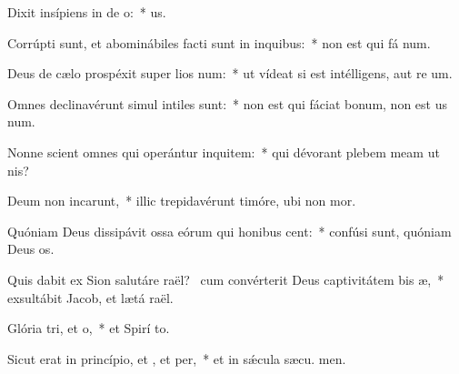 \item Dixit insípiens in de o:~*   us.
\item Corrúpti sunt, et abominábiles facti sunt in inquibus:~* non est qui fá num.
\item Deus de cælo prospéxit super lios num:~* ut vídeat si est intélligens, aut re um.
\item Omnes declinavérunt simul intiles  sunt:~* non est qui fáciat bonum, non est us  num.
\item Nonne scient omnes qui operántur inquitem:~* qui dévorant plebem meam ut  nis?
\item Deum non incarunt,~* illic trepidavérunt timóre, ubi non  mor.
\item Quóniam Deus dissipávit ossa eórum qui honibus cent:~* confúsi sunt, quóniam Deus  os.
\item Quis dabit ex Sion salutáre raël?~\pscross{} cum convérterit Deus captivitátem bis æ,~* exsultábit Jacob, et lætá raël.
\item Glória tri, et o,~* et Spirí to.
\item Sicut erat in princípio, et , et per,~* et in sǽcula sæcu. men.
